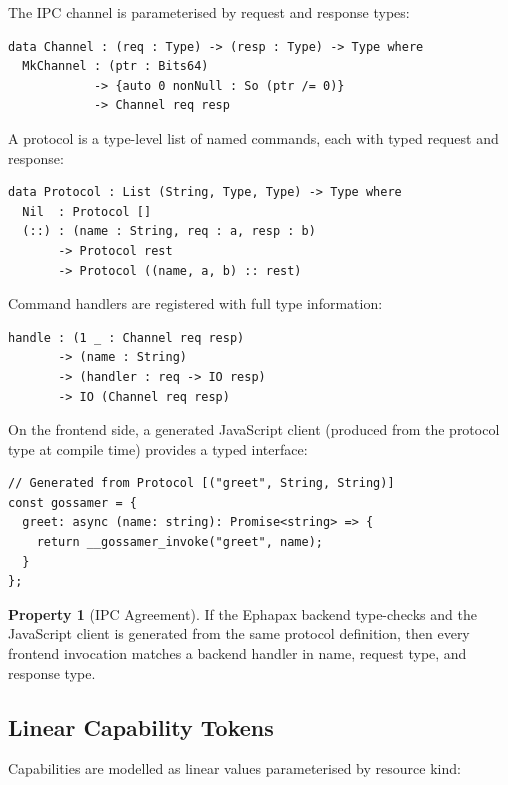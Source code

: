 \documentclass[11pt,a4paper]{article}
\theoremstyle{definition}
\newtheorem{property}{Property}[section]
\begin{document}
The IPC channel is parameterised by request and response types:

\begin{lstlisting}[style=idris]
data Channel : (req : Type) -> (resp : Type) -> Type where
  MkChannel : (ptr : Bits64)
            -> {auto 0 nonNull : So (ptr /= 0)}
            -> Channel req resp
\end{lstlisting}

A protocol is a type-level list of named commands, each with typed
request and response:

\begin{lstlisting}[style=idris]
data Protocol : List (String, Type, Type) -> Type where
  Nil  : Protocol []
  (::) : (name : String, req : a, resp : b)
       -> Protocol rest
       -> Protocol ((name, a, b) :: rest)
\end{lstlisting}

Command handlers are registered with full type information:

\begin{lstlisting}[style=idris]
handle : (1 _ : Channel req resp)
       -> (name : String)
       -> (handler : req -> IO resp)
       -> IO (Channel req resp)
\end{lstlisting}

On the frontend side, a generated JavaScript client (produced from the
protocol type at compile time) provides a typed interface:

\begin{lstlisting}[style=ephapax]
// Generated from Protocol [("greet", String, String)]
const gossamer = {
  greet: async (name: string): Promise<string> => {
    return __gossamer_invoke("greet", name);
  }
};
\end{lstlisting}

\begin{property}[IPC Agreement]
If the Ephapax backend type-checks and the JavaScript client is
generated from the same protocol definition, then every frontend
invocation matches a backend handler in name, request type, and
response type.
\end{property}

\subsection{Linear Capability Tokens}
\label{sec:capabilities}

Capabilities are modelled as linear values parameterised by resource
kind:
\end{document}
